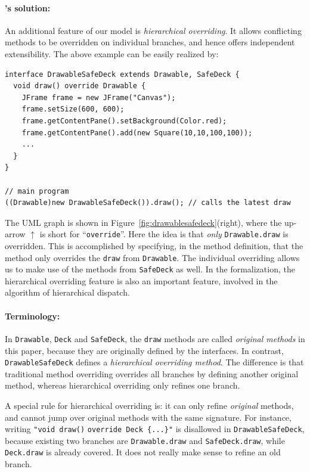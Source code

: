 \paragraph{\MIM{}'s solution:} An additional feature of our model is \textit{hierarchical overriding}. It allows conflicting methods
to be overridden on individual branches, and hence offers independent extensibility. The above example can be easily realized by:
\vspace{3pt}\begin{lstlisting}
interface DrawableSafeDeck extends Drawable, SafeDeck {
  void draw() override Drawable {
    JFrame frame = new JFrame("Canvas");
    frame.setSize(600, 600);
    frame.getContentPane().setBackground(Color.red);
    frame.getContentPane().add(new Square(10,10,100,100));
    ...
  }
}

// main program
((Drawable)new DrawableSafeDeck()).draw(); // calls the latest draw
\end{lstlisting}\vspace{3pt}

The UML graph is shown in Figure~\ref{fig:drawablesafedeck}(right), where
the up-arrow $\uparrow$ is short for ``\lstinline|override|''.
Here the idea is that \emph{only} \lstinline{Drawable.draw} is
overridden. This is accomplished by specifying, in the method
definition, that the method only overrides the \lstinline|draw| 
from \lstinline|Drawable|.  
The individual overriding allows us to make use of the methods from \lstinline|SafeDeck| as well. In the formalization, the 
hierarchical overriding feature is also an important feature, involved in the algorithm of hierarchical dispatch.

\paragraph{Terminology:} In \lstinline|Drawable|, \lstinline|Deck| and \lstinline|SafeDeck|, the \lstinline|draw| methods are called \textit{original methods} in this paper, because they are originally defined by the interfaces.
In contrast, \lstinline|DrawableSafeDeck| defines a \textit{hierarchical overriding method}. The difference is that traditional method overriding overrides all branches by defining another original method, whereas hierarchical overriding only refines one branch.

A special rule for hierarchical overriding is: it can only refine \textit{original} methods, and cannot jump over original methods with the same signature. For instance, writing \lstinline|"void draw()| \lstinline|override Deck {...}"| is disallowed in \lstinline|DrawableSafeDeck|, because existing two branches are \lstinline|Drawable.draw| and \lstinline|SafeDeck.draw|, while \lstinline|Deck.draw| is already covered. It does not really make sense to refine an old branch.


